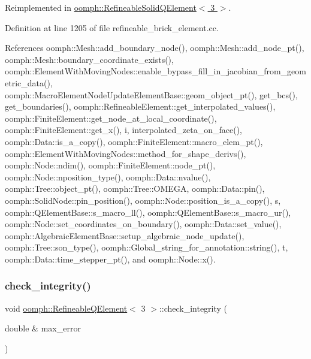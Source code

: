 Reimplemented in \hyperlink{classoomph_1_1RefineableSolidQElement_3_013_01_4_a62db84d609d99537e4180bf897a81a9b}{oomph\+::\+Refineable\+Solid\+Q\+Element$<$ 3 $>$}.



Definition at line 1205 of file refineable\+\_\+brick\+\_\+element.\+cc.



References oomph\+::\+Mesh\+::add\+\_\+boundary\+\_\+node(), oomph\+::\+Mesh\+::add\+\_\+node\+\_\+pt(), oomph\+::\+Mesh\+::boundary\+\_\+coordinate\+\_\+exists(), oomph\+::\+Element\+With\+Moving\+Nodes\+::enable\+\_\+bypass\+\_\+fill\+\_\+in\+\_\+jacobian\+\_\+from\+\_\+geometric\+\_\+data(), oomph\+::\+Macro\+Element\+Node\+Update\+Element\+Base\+::geom\+\_\+object\+\_\+pt(), get\+\_\+bcs(), get\+\_\+boundaries(), oomph\+::\+Refineable\+Element\+::get\+\_\+interpolated\+\_\+values(), oomph\+::\+Finite\+Element\+::get\+\_\+node\+\_\+at\+\_\+local\+\_\+coordinate(), oomph\+::\+Finite\+Element\+::get\+\_\+x(), i, interpolated\+\_\+zeta\+\_\+on\+\_\+face(), oomph\+::\+Data\+::is\+\_\+a\+\_\+copy(), oomph\+::\+Finite\+Element\+::macro\+\_\+elem\+\_\+pt(), oomph\+::\+Element\+With\+Moving\+Nodes\+::method\+\_\+for\+\_\+shape\+\_\+derivs(), oomph\+::\+Node\+::ndim(), oomph\+::\+Finite\+Element\+::node\+\_\+pt(), oomph\+::\+Node\+::nposition\+\_\+type(), oomph\+::\+Data\+::nvalue(), oomph\+::\+Tree\+::object\+\_\+pt(), oomph\+::\+Tree\+::\+O\+M\+E\+GA, oomph\+::\+Data\+::pin(), oomph\+::\+Solid\+Node\+::pin\+\_\+position(), oomph\+::\+Node\+::position\+\_\+is\+\_\+a\+\_\+copy(), s, oomph\+::\+Q\+Element\+Base\+::s\+\_\+macro\+\_\+ll(), oomph\+::\+Q\+Element\+Base\+::s\+\_\+macro\+\_\+ur(), oomph\+::\+Node\+::set\+\_\+coordinates\+\_\+on\+\_\+boundary(), oomph\+::\+Data\+::set\+\_\+value(), oomph\+::\+Algebraic\+Element\+Base\+::setup\+\_\+algebraic\+\_\+node\+\_\+update(), oomph\+::\+Tree\+::son\+\_\+type(), oomph\+::\+Global\+\_\+string\+\_\+for\+\_\+annotation\+::string(), t, oomph\+::\+Data\+::time\+\_\+stepper\+\_\+pt(), and oomph\+::\+Node\+::x().

\mbox{\label{classoomph_1_1RefineableQElement_3_013_01_4_ac956bd05c434861ba65b0431024c1072}} 
\subsubsection{\texorpdfstring{check\+\_\+integrity()}{check\_integrity()}}
{\footnotesize\ttfamily void \hyperlink{classoomph_1_1RefineableQElement}{oomph\+::\+Refineable\+Q\+Element}$<$ 3 $>$\+::check\+\_\+integrity (\begin{DoxyParamCaption}\item[{double \&}]{max\+\_\+error }\end{DoxyParamCaption})\hspace{0.3cm}{\ttfamily [virtual]}}



